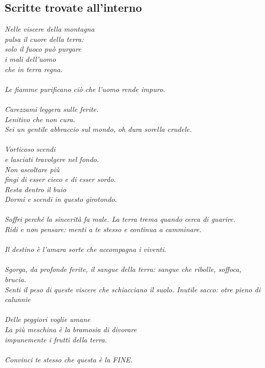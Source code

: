 \documentclass[10pt,twoside,twocolumn]{article}
\begin{document}
\subsection{Scritte trovate all'interno}
\textit{
  Nelle viscere della montagna\\
  pulsa il cuore della terra:\\
  solo il fuoco pu\`o purgare\\
  i mali dell'uomo\\
  che in terra regna.\\
  \\
  Le fiamme purificano ci\`o che l'uomo rende impuro.\\
  \\
  Carezzami leggera sulle ferite.\\
  Lenitivo che non cura.\\
  Sei un gentile abbraccio sul mondo, oh dura sorella crudele.\\
  \\
  Vorticoso scendi\\
  e lasciati travolgere nel fondo.\\
  Non ascoltare più\\
  fingi di esser cieco e di esser sordo.\\
  Resta dentro il buio\\
  Dormi e scendi in questo girotondo.\\
  \\
  Soffri perché la sincerità fa male. La terra trema quando cerca di guarire.\\
  Ridi e non pensare: menti a te stesso e continua a camminare.\\
  \\
  Il destino è l'amara sorte che accompagna i viventi.\\
  \\
  Sgorga, da profonde ferite, il sangue della terra: sangue che ribolle, soffoca, brucia.\\
  Senti il peso di queste viscere che schiacciano il suolo. Inutile sacco: otre pieno di calunnie\\
  \\
  Delle peggiori voglie umane\\
  La più meschina è la bramosia di divorare\\
  impunemente i frutti della terra.\\
  \\
  Convinci te stesso che questa è la FINE.\\
}
\end{document}
